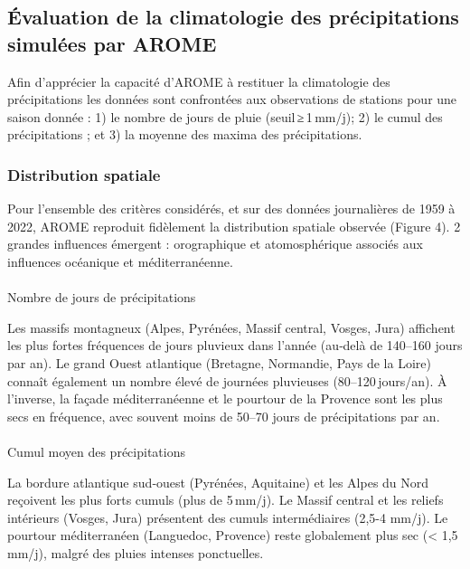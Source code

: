 \documentclass[
  article,
  nofooter,
  noheadings]{jss}
\makeatletter
\let\oldparagraph\paragraph
\renewcommand{\paragraph}{
    \@ifstar
      \xxxParagraphStar
      \xxxParagraphNoStar
  }
\newcommand{\xxxParagraphStar}[1]{\oldparagraph*{#1}\mbox{}}
\newcommand{\xxxParagraphNoStar}[1]{\oldparagraph{#1}\mbox{}}
\makeatother
\begin{document}
\subsection{Évaluation de la climatologie des précipitations simulées
par
AROME}\label{uxe9valuation-de-la-climatologie-des-pruxe9cipitations-simuluxe9es-par-arome}

Afin d'apprécier la capacité d'AROME à restituer la climatologie des
précipitations les données sont confrontées aux observations de stations
pour une saison donnée : 1) le nombre de jours de pluie
(seuil\,≥\,1\,mm/j); 2) le cumul des précipitations ; et 3) la moyenne
des maxima des précipitations.

\subsubsection{Distribution spatiale}\label{distribution-spatiale}

Pour l'ensemble des critères considérés, et sur des données journalières
de 1959 à 2022, AROME reproduit fidèlement la distribution spatiale
observée (Figure 4). 2 grandes influences émergent : orographique et
atomosphérique associés aux influences océanique et méditerranéenne.

\paragraph{Nombre de jours de
précipitations}\label{nombre-de-jours-de-pruxe9cipitations}

Les massifs montagneux (Alpes, Pyrénées, Massif central, Vosges, Jura)
affichent les plus fortes fréquences de jours pluvieux dans l'année
(au‑delà de 140--160 jours par an). Le grand Ouest atlantique (Bretagne,
Normandie, Pays de la Loire) connaît également un nombre élevé de
journées pluvieuses (80--120\,jours/an). À l'inverse, la façade
méditerranéenne et le pourtour de la Provence sont les plus secs en
fréquence, avec souvent moins de 50--70 jours de précipitations par an.

\paragraph{Cumul moyen des
précipitations}\label{cumul-moyen-des-pruxe9cipitations}

La bordure atlantique sud‑ouest (Pyrénées, Aquitaine) et les Alpes du
Nord reçoivent les plus forts cumuls (plus de 5\,mm/j). Le Massif
central et les reliefs intérieurs (Vosges, Jura) présentent des cumuls
intermédiaires (2,5-4 mm/j). Le pourtour méditerranéen (Languedoc,
Provence) reste globalement plus sec (\textless{} 1,5 mm/j), malgré des
pluies intenses ponctuelles.
\end{document}

